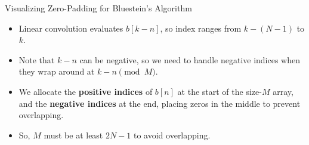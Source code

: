 \begin{frame}{Visualizing Zero-Padding for Bluestein's Algorithm}
\begin{center}
{
        }
    \end{center}

    \vspace{-0.3cm}
    \begin{itemize}
        \item Linear convolution evaluates $b[k-n]$, so index ranges from $k-(N-1)$ to $k$.
        \item Note that $k-n$ can be negative, so we need to handle negative indices when they wrap around at $k - n \pmod{M}$.
        \item We allocate the \textbf{positive indices} of $b[n]$ at the start of the size-$M$ array, and the \textbf{negative indices} at the end, placing zeros in the middle to prevent overlapping.
        \item So, $M$ must be at least $2N-1$ to avoid overlapping.
    \end{itemize}
\end{frame}

